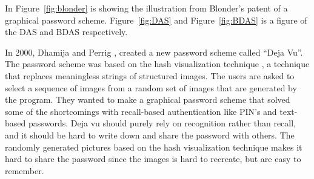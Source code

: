   In Figure~\ref{fig:blonder} is showing the illustration from Blonder's patent of a graphical password scheme. Figure~\ref{fig:DAS} and Figure~\ref{fig:BDAS} is a figure of the DAS and BDAS respectively.

  \begin{figure}[H]
    \centering
  \end{figure}

  In 2000, Dhamija and Perrig \cite{DejaVu}, created a new password scheme called ``Deja Vu''. The password scheme was based on the hash visualization technique \cite{HashVisualization}, a technique that replaces meaningless strings of structured images. The users are asked to select a sequence of images from a random set of images that are generated by the program. They wanted to make a graphical password scheme that solved some of the shortcomings with recall-based authentication like PIN's and text-based passwords. Deja vu should purely rely on recognition rather than recall, and it should be hard to write down and share the password with others. The randomly generated pictures based on the hash visualization technique makes it hard to share the password since the images is hard to recreate, but are easy to remember.

